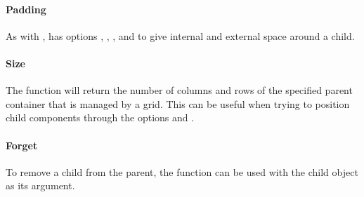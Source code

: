 \paragraph{Padding}
As with ,  has options
, , ,
and  to give internal and external space around a
child.

\paragraph{Size}
The function  will return the number of columns
and rows of the specified parent container that is managed by a
grid. This can be useful when trying to position child components
through the options  and .

\paragraph{Forget}
To remove a child from the parent, the 
function can be used with the child object as its argument.




